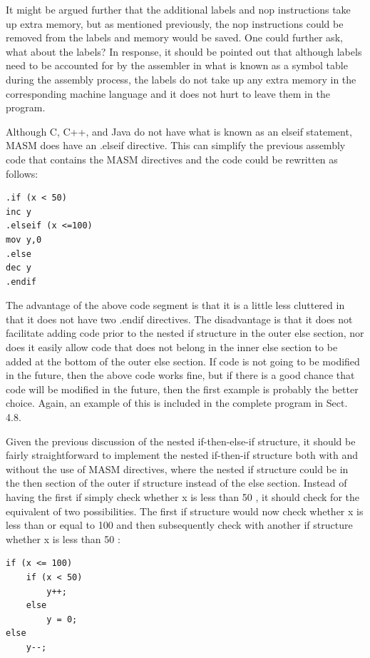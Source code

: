 \documentclass[10pt]{book}
\begin{document}
It might be argued further that the additional labels and nop instructions take up extra memory, but as mentioned previously, the nop instructions could be removed from the labels and memory would be saved. One could further ask, what about the labels? In response, it should be pointed out that although labels need to be accounted for by the assembler in what is known as a symbol table during the assembly process, the labels do not take up any extra memory in the corresponding machine language and it does not hurt to leave them in the program.

Although C, C++, and Java do not have what is known as an elseif statement, MASM does have an .elseif directive. This can simplify the previous assembly code that contains the MASM directives and the code could be rewritten as follows:

\begin{verbatim}
.if (x < 50)
inc y
.elseif (x <=100)
mov y,0
.else
dec y
.endif
\end{verbatim}

The advantage of the above code segment is that it is a little less cluttered in that it does not have two .endif directives. The disadvantage is that it does not facilitate adding code prior to the nested if structure in the outer else section, nor does it easily allow code that does not belong in the inner else section to be added at the bottom of the outer else section. If code is not going to be modified in the future, then the above code works fine, but if there is a good chance that code will be modified in the future, then the first example is probably the better choice. Again, an example of this is included in the complete program in Sect. 4.8.

Given the previous discussion of the nested if-then-else-if structure, it should be fairly straightforward to implement the nested if-then-if structure both with and without the use of MASM directives, where the nested if structure could be in the then section of the outer if structure instead of the else section. Instead of having the first if simply check whether x is less than 50 , it should check for the equivalent of two possibilities. The first if structure would now check whether x is less than or equal to 100 and then subsequently check with another if structure whether x is less than 50 :

\begin{verbatim}
if (x <= 100)
    if (x < 50)
        y++;
    else
        y = 0;
else
    y--;
\end{verbatim}
\end{document}

